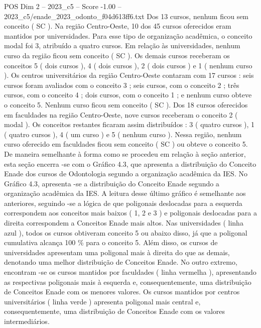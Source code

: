 \begin{textsample}{POS Dim 2 – 2023\_c5 – Score -1.00 – 2023\_c5/enade\_2023\_odonto\_f04d613ff6.txt}
Dos 13 cursos, nenhum ficou sem conceito ( SC ).
Na região Centro-Oeste, 10 dos 45 cursos oferecidos eram mantidos por universidades.
Para esse tipo de organização acadêmica, o conceito modal foi 3, atribuído a quatro cursos.
Em relação às universidades, nenhum curso da região ficou sem conceito ( SC ).
Os demais cursos receberam os conceitos 5 ( dois cursos ), 4 ( dois cursos ), 2 ( dois cursos ) e 1 ( nenhum curso ).
Os centros universitários da região Centro-Oeste contaram com 17 cursos : seis cursos foram avaliados com o conceito 3 ; seis cursos, com o conceito 2 ; três cursos, com o conceito 4 ; dois cursos, com o conceito 1 ; e nenhum curso obteve o conceito 5.
Nenhum curso ficou sem conceito ( SC ).
Dos 18 cursos oferecidos em faculdades na região Centro-Oeste, nove cursos receberam o conceito 2 ( modal ).
Os conceitos restantes ficaram assim distribuídos : 3 ( quatro cursos ), 1 ( quatro cursos ), 4 ( um curso ) e 5 ( nenhum curso ).
Nessa região, nenhum curso oferecido em faculdades ficou sem conceito ( SC ) ou obteve o conceito 5.
De maneira semelhante à forma como se procedeu em relação à seção anterior, esta seção encerra -se com o Gráfico 4.3, que apresenta a distribuição do Conceito Enade dos cursos de Odontologia segundo a organização acadêmica da IES.
No Gráfico 4.3, apresenta -se a distribuição do Conceito Enade segundo a organização acadêmica da IES.
A leitura desse último gráfico é semelhante aos anteriores, seguindo -se a lógica de que poligonais deslocadas para a esquerda correspondem aos conceitos mais baixos ( 1, 2 e 3 ) e poligonais deslocadas para a direita correspondem a Conceitos Enade mais altos.
Nas universidades ( linha azul ), todos os cursos obtiveram conceito 5 ou abaixo disso, já que a poligonal cumulativa alcança 100 \% para o conceito 5.
Além disso, os cursos de universidades apresentam uma poligonal mais à direita do que as demais, denotando uma melhor distribuição de Conceitos Enade.
No outro extremo, encontram -se os cursos mantidos por faculdades ( linha vermelha ), apresentando as respectivas poligonais mais à esquerda e, consequentemente, uma distribuição de Conceitos Enade com os menores valores.
Os cursos mantidos por centros universitários ( linha verde ) apresenta poligonal mais central e, consequentemente, uma distribuição de Conceitos Enade com os valores intermediários.

\end{textsample}
